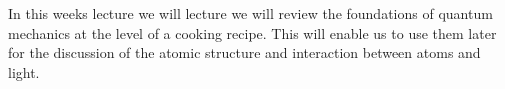 In this weeks lecture we will  lecture we will review the foundations of quantum mechanics at the level of a cooking recipe. This will enable us to use them later for the discussion of the atomic structure and interaction between atoms and light.